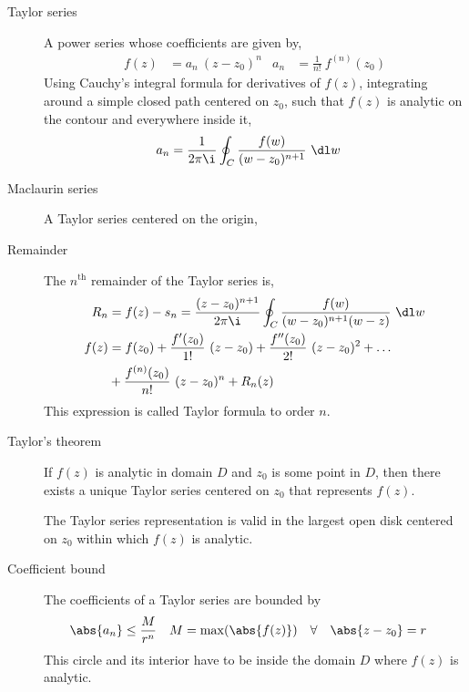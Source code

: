 \begin{description}
    \item[Taylor series] A power series whose coefficients are given by,
        \begin{align}
            f(z) & = a_n\ (z - z_0)^n           &
            a_n  & = \frac{1}{n!}\ f^{(n)}(z_0)
        \end{align}
        Using Cauchy's integral formula for derivatives of $ f(z) $, integrating
        around a simple closed path centered on $ z_0 $, such that $ f(z) $ is
        analytic on the contour and everywhere inside it,
        \begin{align}
            a_n & = \frac{1}{2\pi\i} \oint_C \frac{f(w)}{(w - z_0)^{n+1}}\ \dl w
        \end{align}

    \item[Maclaurin series] A Taylor series centered on the origin,

    \item[Remainder] The $ n^{\text{th}} $ remainder of the Taylor series is,
        \begin{align}
            R_n  & = f(z) - s_n = \frac{(z - z_0)^{n+1}}{2\pi\i} \oint_C
            \frac{f(w)}{(w - z_0)^{n+1} (w - z)}\ \dl w                           \\
            f(z) & = f(z_0) + \frac{f'(z_0)}{1!}\ (z - z_0) + \frac{f''(z_0)}{2!}
            \ (z - z_0)^2 + \dots                                                 \\
                 & + \frac{f^{(n)}(z_0)}{n!}\ (z - z_0)^n + R_n(z)
        \end{align}
        This expression is called Taylor formula to order $ n $.

    \item[Taylor's theorem] If $ f(z) $ is analytic in domain $ D $ and $ z_0 $ is some
        point in $ D $, then there exists a unique Taylor series centered on $ z_0 $ that
        represents $ f(z) $. \par

        The Taylor series representation is valid in the largest open disk centered on
        $ z_0 $ within which $ f(z) $ is analytic.

    \item[Coefficient bound] The coefficients of a Taylor series are bounded by
        \begin{align}
            \abs{a_n} & \leq \frac{M}{r^n}                                       &
            M         & = \max(\abs{f(z)}) \quad \forall \quad \abs{z - z_0} = r
        \end{align}
        This circle and its interior have to be inside the domain $ D $ where $ f(z) $
        is analytic.


\end{description}
